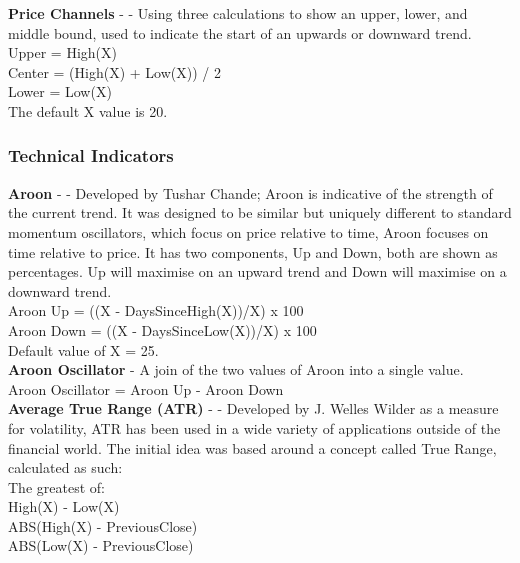 \documentclass[12pt,a4paper]{article}
\begin{document}
\iffalse
[]
\fi

\noindent
\textbf{Price Channels} - \cite{Murphy1999} - Using three calculations to show an upper, lower, and middle bound, used to indicate the start of an upwards or downward trend.\\

\noindent
Upper = High(X)\\
Center = (High(X) + Low(X)) / 2\\
Lower = Low(X)\\
The default X value is 20.

\iffalse
[]
\fi

\iffalse
#################################################################################
\fi

\subsubsection{Technical Indicators}

\textbf{Aroon} - \cite{Chande1994} - Developed by Tushar Chande; Aroon is indicative of the strength of the current trend. It was designed to be similar but uniquely different to standard momentum oscillators, which focus on price relative to time, Aroon focuses on time relative to price. It has two components, Up and Down, both are shown as percentages. Up will maximise on an upward trend and Down will maximise on a downward trend.\\

\noindent
Aroon Up = ((X - DaysSinceHigh(X))/X) x 100\\
Aroon Down = ((X - DaysSinceLow(X))/X) x 100\\
Default value of X = 25.\\

\iffalse
[]
\fi

\noindent
\textbf{Aroon Oscillator} - A join of the two values of Aroon into a single value.\\
\noindent
Aroon Oscillator = Aroon Up - Aroon Down\\

\iffalse
[]
\fi

\noindent
\textbf{Average True Range (ATR)} - \cite{Wilder1978} - Developed by J. Welles Wilder as a measure for volatility, ATR has been used in a wide variety of applications outside of the financial world. The initial idea was based around a concept called True Range, calculated as such:\\

\noindent
The greatest of:\\
High(X) - Low(X)\\
ABS(High(X) - PreviousClose)\\
ABS(Low(X) - PreviousClose)\\
\end{document}
